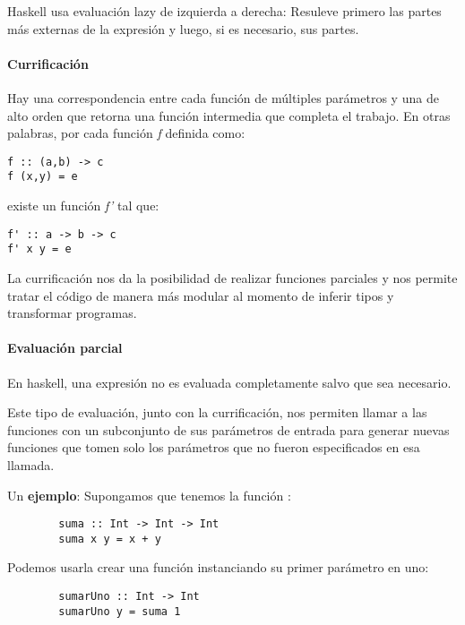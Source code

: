 Haskell usa evaluación lazy de izquierda a derecha: Resuleve primero las partes más externas de la expresión y luego, si es necesario, sus partes.

\paragraph{Currificación} Hay una correspondencia entre cada función de múltiples parámetros y una de alto orden que retorna una función intermedia que completa el trabajo. En otras palabras, por cada función \textit{f} definida como:
\begin{centrado}
	\begin{verbatim}
f :: (a,b) -> c
f (x,y) = e
	\end{verbatim}
\end{centrado} 
existe un función \textit{f'} tal que:
\begin{centrado}
	\begin{verbatim}
f' :: a -> b -> c 
f' x y = e
	\end{verbatim}
\end{centrado} 

La currificación nos da la posibilidad de realizar funciones parciales y nos permite tratar el código de manera más modular al momento de inferir tipos y transformar programas.

\paragraph{Evaluación parcial} En haskell, una expresión no es evaluada completamente salvo que sea necesario.

Este tipo de evaluación, junto con la currificación, nos permiten llamar a las funciones con un subconjunto de sus parámetros de entrada para generar nuevas funciones que tomen solo los parámetros que no fueron especificados en esa llamada.

Un \textbf{ejemplo}: Supongamos que tenemos la función :

\begin{centrado}
	\begin{verbatim}
		suma :: Int -> Int -> Int
		suma x y = x + y
	\end{verbatim}
\end{centrado} 

Podemos usarla crear una función  instanciando su primer parámetro en uno:

\begin{centrado}
	\begin{verbatim}
		sumarUno :: Int -> Int
		sumarUno y = suma 1
	\end{verbatim}
\end{centrado} 


